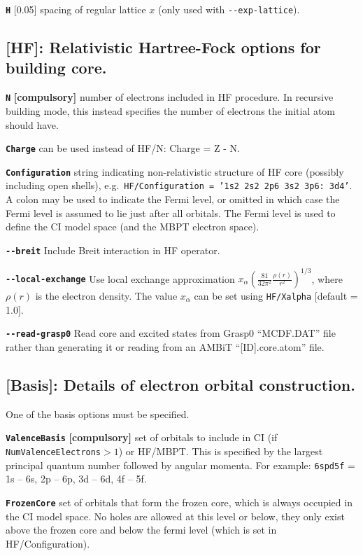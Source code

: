 \documentclass[a4paper,11pt]{article}
\newcommand{\option}[1]{\smallskip\noindent\textbf{\texttt{#1}}}
\newcommand{\code}[1]{\texttt{#1}}
\begin{document}
\option{H} [0.05] spacing of regular lattice $x$ (only used with \texttt{-{}-exp-lattice}).

\subsection{[HF]: Relativistic Hartree-Fock options for building core.}

\option{N} \textbf{[compulsory]} number of electrons included in HF procedure. In recursive building mode, this instead specifies the number of electrons the initial atom should have.

\option{Charge} can be used instead of HF/N: Charge = Z - N.

\option{Configuration} string indicating non-relativistic structure of HF core (possibly including open shells), e.g.~\texttt{HF/Configuration = '1s2 2s2 2p6 3s2 3p6: 3d4'}. A colon may be used to indicate the Fermi level, or omitted in which case the Fermi level is assumed to lie just after all orbitals. The Fermi level is used to define the CI model space (and the MBPT electron space).

\option{-{}-breit} Include Breit interaction in HF operator.

\option{-{}-local-exchange} Use local exchange approximation $x_\alpha \left(\frac{81}{32\pi^2} \frac{\rho(r)}{r^2}\right)^{1/3}$, where $\rho(r)$ is the electron density. The value $x_\alpha$ can be set using \code{HF/Xalpha} [default = 1.0].

\option{-{}-read-grasp0} Read core and excited states from Grasp0 ``MCDF.DAT'' file rather than generating it or reading from an AMBiT ``[ID].core.atom'' file.

\subsection{[Basis]: Details of electron orbital construction.}
One of the basis options must be specified.

\option{ValenceBasis} \textbf{[compulsory]} set of orbitals to include in CI (if \mbox{\texttt{NumValenceElectrons}$>1$}) or HF/MBPT. This is specified by the largest principal quantum number followed by angular momenta. For example:
\texttt{6spd5f} = 1s -- 6s, 2p -- 6p, 3d -- 6d, 4f -- 5f.

\option{FrozenCore} set of orbitals that form the frozen core, which is always occupied in the CI model space. No holes are allowed at this level or below, they only exist above the frozen core and below the fermi level (which is set in HF/Configuration).
\end{document}
